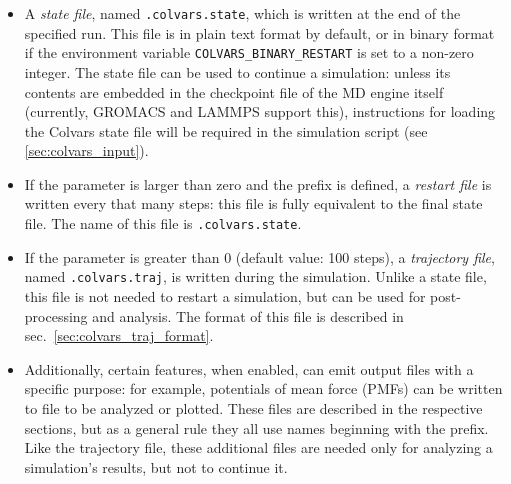 \begin{itemize}

\item A \emph{state file}, named \outputName\texttt{.colvars.state}, which is written at the end of the specified run.
This file is in plain text format by default, or in binary format if the environment variable \texttt{COLVARS\_BINARY\_RESTART} is set to a non-zero integer.
The state file can be used to continue a simulation: unless its contents are embedded in the checkpoint file of the MD engine itself (currently, GROMACS and LAMMPS support this), instructions for loading the Colvars state file will be required in the simulation script (see \ref{sec:colvars_input}).

\item If the parameter  is larger than zero and the \restartName{} prefix is defined, a \emph{restart file} is written every that many steps: this file is fully equivalent to the final state file.
  The name of this file is \restartName\texttt{.colvars.state}.

\item If the parameter  is greater than 0 (default value: 100 steps), a \emph{trajectory file}, named \outputName\texttt{.colvars.traj}, is written during the simulation.  Unlike a state file, this file is not needed to restart a simulation, but can be used for post-processing and analysis.  The format of this file is described in sec.~\ref{sec:colvars_traj_format}.

\item Additionally, certain features, when enabled, can emit output files with a specific purpose: for example, potentials of mean force (PMFs) can be written to file to be analyzed or plotted.  These files are described in the respective sections, but as a general rule they all use names beginning with the \outputName{} prefix.
Like the trajectory file, these additional files are needed only for analyzing a simulation's results, but not to continue it.

\end{itemize}

